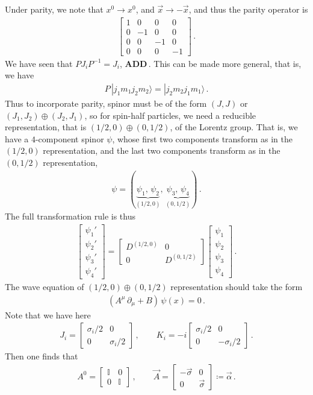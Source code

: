 \documentclass[11pt, onesided]{book}
\theoremstyle{break}
\theoremstyle{break}
\newcommand{\pd}{\partial}
\newcommand{\bmat}[1]{\begin{bmatrix} #1 \end{bmatrix}}
\begin{document}
Under parity, we note that $x^0 \to x^0$, and $\vec{x}\to -\vec{x}$, and thus the parity operator is
\begin{align*}
\bmat{1 & 0 & 0 & 0\\
0 & -1 & 0 & 0\\
0 & 0 & -1 & 0\\
0 & 0 & 0 & -1}\,.
\end{align*}
We have seen that $PJ_iP^{-1} = J_i$, \textbf{ADD}\,.
This can be made more general, that is, we have
\begin{align*}
P\, |j_1m_1j_2m_2\rangle = |j_2m_2j_1m_1\rangle\,.
\end{align*}
Thus to incorporate parity, spinor must be of the form $(J,J)$ or $(J_1,J_2) \oplus (J_2, J_1)$, so for spin-half particles, we need a reducible representation, that is $(1/2,0) \oplus (0,1/2)$, of the Lorentz group. That is, we have a $4$-component spinor $\psi$, whose first two components transform as in the $(1/2,0)$ representation, and the last two components transform as in the $(0,1/2)$ representation,
\begin{align*}
\psi = (\underbrace{\psi_1,\,\psi_2}_{(1/2,0)},\, \underbrace{\psi_3,\,\psi_4}_{(0,1/2)})\,.
\end{align*}
The full transformation rule is thus
\begin{align*}
\bmat{\psi_1'\\ \psi_2' \\ \psi_3' \\ \psi_4'} = \bmat{D^{(1/2,0)} & 0 \\ 0 & D^{(0,1/2)}} \bmat{\psi_1\\ \psi_2 \\ \psi_3 \\ \psi_4}\,. 
\end{align*}
The wave equation of $(1/2,0) \oplus (0,1/2)$ representation should take the form
\begin{align*}
(A^\mu \, \pd_\mu + B) \, \psi(x) = 0\,.
\end{align*}
Note that we have here
\begin{align*}
J_i = \bmat{\sigma_i/2 & 0 \\ 0 & \sigma_i/2}\,,\qquad
K_i = -i \bmat{\sigma_i/2 & 0 \\ 0 & -\sigma_i/2}\,.
\end{align*}
Then one finds that
\begin{align*}
A^0 = \bmat{\mathbb{I} & 0 \\ 0 & \mathbb{I}}\,, \qquad \vec{A} = \bmat{-\vec{\sigma} & 0 \\ 0 & \vec{\sigma}} \coloneqq \vec{\alpha}\,.
\end{align*}
\end{document}
